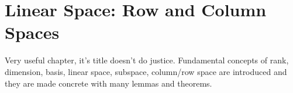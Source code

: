 \documentclass[a4paper, oneside]{book}
\begin{document}
\chapter{Linear Space: Row and Column Spaces}

Very useful chapter, it's title doesn't do justice. Fundamental concepts of rank, dimension, basis, linear space, subspace, column/row space are introduced and they are made concrete with many lemmas and theorems.
\end{document}
